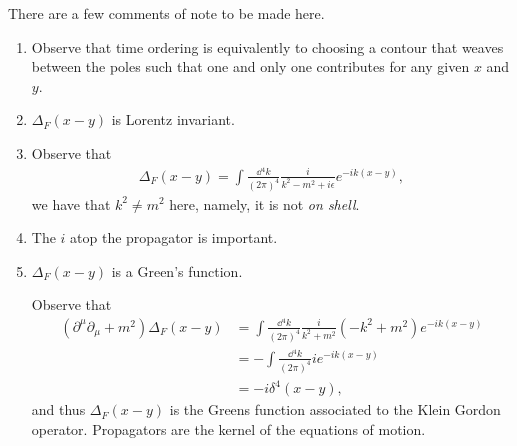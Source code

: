 There are a few comments of note to be made here.
\begin{enumerate}[label=\arabic*)]
    \item Observe that time ordering is equivalently to choosing a contour that weaves between the poles such that one and only one contributes for any given $x$ and $y$.
    \item $\Delta_F \left( x -y \right) $ is Lorentz invariant.
    \item Observe that
        \begin{align}
            \Delta_F \left( x - y \right) = \int \frac{\dd{^{4}k}}{\left( 2\pi \right)^{4}} \frac{i}{k^2 - m^2 + i \epsilon} e^{-i k \left( x -y \right) }
        ,\end{align}
        we have that $k^2 \neq m^2$ here, namely, it is not \textit{on shell}.
    \item The $i$ atop the propagator is important.
    \item $\Delta_F \left( x -y \right) $ is a Green's function.

        Observe that
        \begin{align}
            \left( \partial^{\mu} \partial_\mu + m^2 \right) \Delta_{F}\left( x - y \right) &= \int \frac{\dd{^{4}k}}{\left( 2\pi \right)^{4}} \frac{i}{k^2 + m^2} \left( - k^2 + m^2 \right) e^{-i k \left( x -y \right) } \\
            &= - \int \frac{\dd{^4k}}{\left( 2\pi\right)^4} i e^{-i k \left( x - y \right) } \\
            &= -i \delta^{4} \left( x - y \right) 
        ,\end{align}
        and thus $\Delta_F \left( x -y \right) $ is the Greens function associated to the Klein Gordon operator. Propagators are the kernel of the equations of motion.
\end{enumerate}

